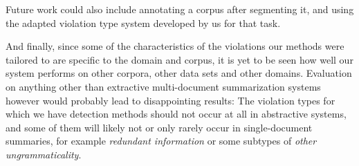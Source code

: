 \documentclass[a4paper,10pt]{scrartcl}
\theoremstyle{style}
\begin{document}
Future work could also include annotating a corpus after segmenting it, and using the adapted violation type system developed by us for that task.

And finally, since some of the characteristics of the violations our methods were tailored to are specific to the domain and corpus, it is yet to be seen how well our system performs on other corpora, other data sets and other domains.
Evaluation on anything other than extractive multi-document summarization systems however would probably lead to disappointing results: The violation types for which we have detection methods should not occur at all in abstractive systems, and some of them will likely not or only rarely occur in single-document summaries, for example \textit{redundant information} or some subtypes of \textit{other ungrammaticality}.

\newpage


\end{document}
